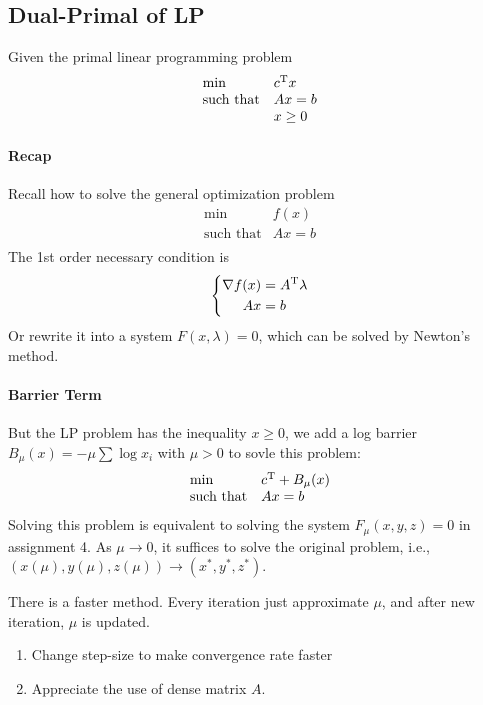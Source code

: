 \subsection{Dual-Primal of LP}
Given the primal linear programming problem
\[
\begin{array}{ll}
\min&c^{\mathrm T} x\\
\mbox{such that}&Ax=b\\
&x\ge0
\end{array}
\]
\paragraph{Recap}
Recall how to solve the general optimization problem
\[
\begin{array}{ll}
\min&f(x)\\
\mbox{such that}&Ax=b\\
\end{array}
\]
The 1st order necessary condition is 
\[
\left\{
\begin{aligned}
\nabla f(x)&=A^{\mathrm T}\lambda\\
Ax&=b
\end{aligned}
\right.
\]
Or rewrite it into a system $F(x,\lambda)=0$, which can be solved by Newton's method.
\paragraph{Barrier Term}
But the LP problem has the inequality $x\ge0$, we add a log barrier $B_\mu(x)=-\mu\sum\log x_i$ with $\mu>0$ to sovle this problem:
\[
\begin{array}{ll}
\min&c^{\mathrm T}+B_\mu(x)\\
\mbox{such that}&Ax=b
\end{array}
\]
Solving this problem is equivalent to solving the system $F_\mu(x,y,z)=0$ in assignment 4. As $\mu\to0$, it suffices to solve the original problem, i.e., $(x(\mu),y(\mu),z(\mu))\to(x^*,y^*,z^*)$.
\begin{remark}
There is a faster method. Every iteration just approximate $\mu$, and after new iteration, $\mu$ is updated.
\end{remark}

\begin{enumerate}
\item
Change step-size to make convergence rate faster
\item
Appreciate the use of dense matrix $A$.
\end{enumerate}

